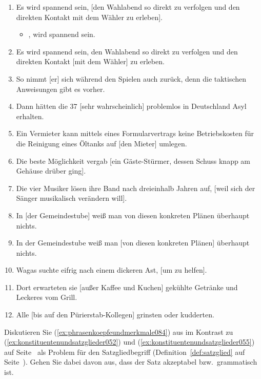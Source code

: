 \begin{enumerate}
  \item Es wird spannend sein, [den Wahlabend so direkt zu verfolgen und den direkten Kontakt mit dem Wähler zu erleben].
    \begin{itemize}
      \item {}, wird spannend sein.
    \end{itemize}
  \item Es wird spannend sein, den Wahlabend so direkt zu verfolgen und den direkten Kontakt [mit dem Wähler] zu erleben.
  \item So nimmt [er] sich während den Spielen auch zurück, denn die taktischen Anweisungen gibt es vorher.
  \item Dann hätten die 37 [sehr wahrscheinlich] problemlos in Deutschland Asyl erhalten.
  \item Ein Vermieter kann mittels eines Formularvertrags keine Betriebskosten für die Reinigung eines Öltanks auf [den Mieter] umlegen.
  \item Die beste Möglichkeit vergab [ein Gäste-Stürmer, dessen Schuss knapp am Gehäuse drüber ging].
  \item Die vier Musiker lösen ihre Band nach dreieinhalb Jahren auf, [weil sich der Sänger musikalisch verändern will].
  \item In [der Gemeindestube] weiß man von diesen konkreten Plänen überhaupt nichts.
  \item In der Gemeindestube weiß man [von diesen konkreten Plänen] überhaupt nichts.
  \item Wagas suchte eifrig nach einem dickeren Ast, [um zu helfen].
  \item Dort erwarteten sie [außer Kaffee und Kuchen] gekühlte Getränke und Leckeres vom Grill.
  \item Alle [bis auf den Pürierstab-Kollegen] grinsten oder kudderten.
\end{enumerate}

 \label{exc:konstituentenstruktur03} Diskutieren Sie (\ref{ex:phrasenkoepfeundmerkmale084}) aus \citet[1--2]{Dekuthy2002} im Kontrast zu (\ref{ex:konstituentenundsatzglieder052}) und (\ref{ex:konstituentenundsatzglieder055}) auf Seite~\pageref{ex:konstituentenundsatzglieder052} als Problem für den Satzgliedbegriff (Definition~\ref{def:satzglied} auf Seite~\pageref{def:satzglied}).
Gehen Sie dabei davon aus, dass der Satz akzeptabel bzw.\ grammatisch ist.

\begin{exe}
\end{exe}
